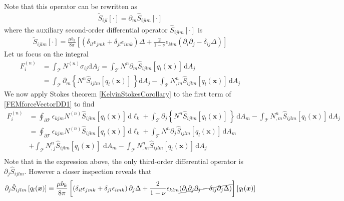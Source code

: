 {
Note that this operator can be rewritten as 
\begin{align}
\tilde{S}_{ijl}[\cdot]=\partial_m\hat{S}_{ijlm}[\cdot]
\end{align}
where the auxiliary second-order differential operator $\hat{S}_{ijlm}[\cdot]$ is
\begin{align}
\tilde{S}_{ijlm}[\cdot]=\frac{\mu b_k}{8\pi}\left[\left(\delta_{il}\epsilon_{jmk}+\delta_{jl}\epsilon_{imk}\right)\Delta+\frac{2}{1-\nu}\epsilon_{klm}\left(\partial_{i}\partial_j-\delta_{ij}\Delta\right)\right]
\end{align}
Let us focus on the integral
\begin{align}
F^{(n)}_{i}&=\int_\mathcal{T}N^{(n)} \sigma_{ij}\text{d}A_j
=\int_\mathcal{T}N^n \partial_m \hat{S}_{ijlm}\left[q_l(\bm x)\right]\, \text{d}A_j\nonumber\\
&=\int_\mathcal{T}\partial_m\left\{N^n  \hat{S}_{ijlm}\left[q_l(\bm x)\right]\, \right\}\text{d}A_j
-\int_\mathcal{T}N^n_{,m}  \hat{S}_{ijlm}\left[q_l(\bm x)\right]\, \text{d}A_j
\label{FEMforceVectorDD1}
\end{align}
We now apply Stokes theorem \eqref{KelvinStokesCorollary} to the first term of \eqref{FEMforceVectorDD1} to find
\begin{align}
F^{(n)}_{i}
&=
\oint_{\partial \mathcal{T}}\epsilon_{kjm}N^{(n)}\hat{S}_{ijlm}\left[q_l(\bm x)\right]\, \text{d}\ell_k
+\int_\mathcal{T}\partial_j\left\{N^n  \hat{S}_{ijlm}\left[q_l(\bm x)\right]\, \right\}\, \text{d}A_m
-\int_\mathcal{T}N^n_{,m}  \hat{S}_{ijlm}\left[q_l(\bm x)\right]\, \text{d}A_j\nonumber\\
&=
\oint_{\partial \mathcal{T}}\epsilon_{kjm}N^{(n)}\hat{S}_{ijlm}\left[q_l(\bm x)\right]\, \text{d}\ell_k
+\int_\mathcal{T} N^n  \partial_j\hat{S}_{ijlm}\left[q_l(\bm x)\right]\, \text{d}A_m\nonumber\\
&+\int_\mathcal{T}N^n_{,j}  \hat{S}_{ijlm}\left[q_l(\bm x)\right]\, \, \text{d}A_m
-\int_\mathcal{T}N^n_{,m}  \hat{S}_{ijlm}\left[q_l(\bm x)\right]\, \text{d}A_j\nonumber\\
\label{FEMforceVectorDD2}
\end{align}
Note that in the expression above, the only third-order differential operator is $\partial_j\hat{S}_{ijlm}$. However a closer inspection reveals that
\begin{align}
\partial_j\hat{S}_{ijlm}\left[q_l(\bm x)\right]
&=\frac{\mu b_k}{8\pi}\left[\left(\delta_{il}\epsilon_{jmk}+\delta_{jl}\epsilon_{imk}\right)\partial_j\Delta+\frac{2}{1-\nu}\epsilon_{klm}\cancel{\left(\partial_{i}\partial_j\partial_j-\delta_{ij}\partial_j\Delta\right)}\right]\left[q_l(\bm x)\right]\nonumber\\

\end{align}}
